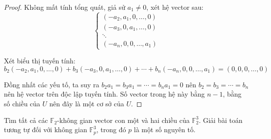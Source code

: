 \documentclass[class=linearalgebra,crop=false]{standalone}
\begin{document}
\begin{proof}
    \par Không mất tính tổng quát, giả sử $a_{1}\ne 0$, xét hệ vector sau:
    \[
        \begin{cases}
            (-a_{2}, a_{1}, 0, \ldots, 0) \\
            (-a_{3}, 0, a_{1}, \ldots, 0) \\
            \ddots                        \\
            (-a_{n}, 0, 0, \ldots, a_{1})
        \end{cases}
    \]
    \par Xét biểu thị tuyến tính:
    \[ b_{2}(-a_{2}, a_{1}, 0, \ldots, 0) + b_{3}(-a_{3}, 0, a_{1}, \ldots, 0) + \cdots + b_{n}(-a_{n}, 0, 0, \ldots, a_{1}) = (0,0,0,\ldots, 0) \]
    \par Đồng nhất các yếu tố, ta suy ra $b_{2}a_{1} = b_{3}a_{1} = \cdots = b_{n}a_{1} = 0$ nên $b_{2} = b_{3} = \cdots = b_{n}$ nên hệ vector trên độc lập tuyến tính. Số vector trong hệ này bằng $n - 1$, bằng số chiều của $U$ nên đây là một cơ sở của $U$.
\end{proof}

\begin{exercise}Tìm tất cả các $\mathbb{F}_{2}$-không gian vector con một và hai chiều của $\mathbb{F}^{3}_{2}$. Giải bài toán tương tự đối với không gian $\mathbb{F}^{3}_{p}$, trong đó $p$ là một số nguyên tố.
\end{exercise}
\end{document}
